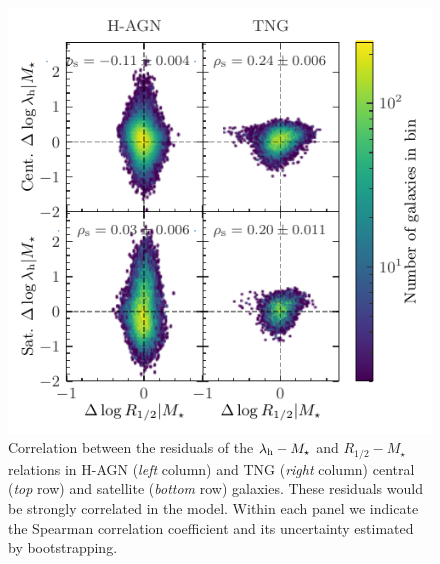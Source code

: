 \documentclass[useAMS,usenatbib]{mnras}
\begin{document}
\begin{figure}
    \centering
    \includegraphics[width=\columnwidth]{Figures/ReffSpin_residuals_corr.pdf}
    \caption{Correlation between the residuals of the $\lambda_{\rm h}-M_\star$ and $R_{1/2}-M_\star$ relations in H-AGN (\emph{left} column) and TNG (\emph{right} column) central (\emph{top} row) and satellite (\emph{bottom} row) galaxies. These residuals would be strongly correlated in the \citet{MMW_1998} model. Within each panel we indicate the Spearman correlation coefficient and its uncertainty estimated by bootstrapping.}
    \label{fig:spin_galaxysizeCorr}
\end{figure}
\end{document}
